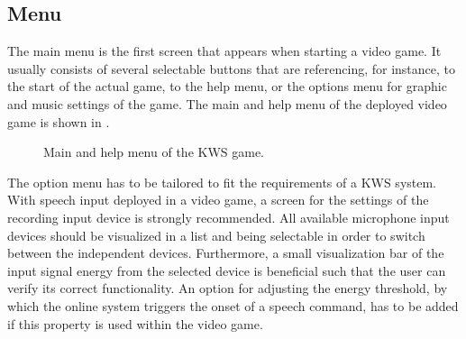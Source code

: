 \subsection{Menu}\label{sec:game_design_menu}
The main menu is the first screen that appears when starting a video game. 
It usually consists of several selectable buttons that are referencing, for instance, to the start of the actual game, to the help menu, or the options menu for graphic and music settings of the game.
The main and help menu of the deployed video game is shown in .
\begin{figure}[!ht]
  \centering
  \qquad
  \caption{Main and help menu of the KWS game.}
  \label{fig:game_design_menu_mainhelp}
\end{figure}
\FloatBarrier
\noindent
The option menu has to be tailored to fit the requirements of a KWS system.
With speech input deployed in a video game, a screen for the settings of the recording input device is strongly recommended.
All available microphone input devices should be visualized in a list and being selectable in order to switch between the independent devices.
Furthermore, a small visualization bar of the input signal energy from the selected device is beneficial such that the user can verify its correct functionality.
An option for adjusting the energy threshold, by which the online system triggers the onset of a speech command, has to be added if this property is used within the video game.
